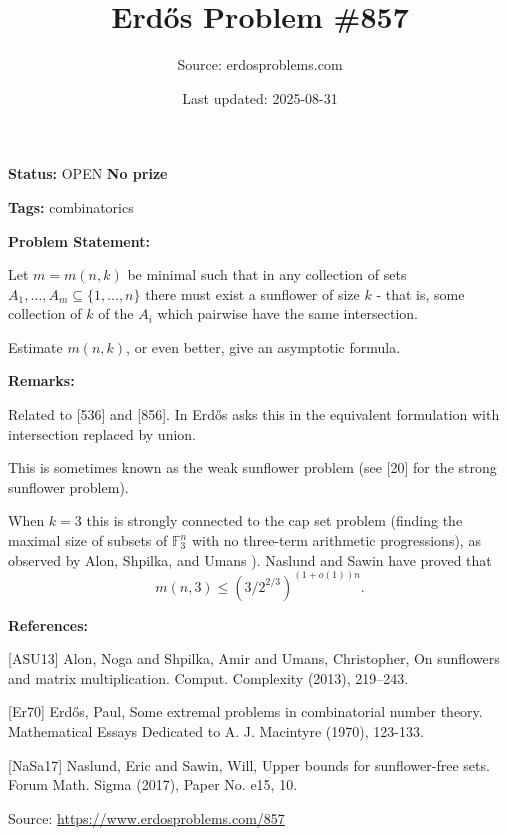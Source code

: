 \documentclass{article}
\title{Erd\H{o}s Problem \#857}
\date{Last updated: 2025-08-31}
\author{Source: erdosproblems.com}
\begin{document}
\maketitle

\noindent\textbf{Status:} OPEN \quad \textbf{No prize}

\noindent\textbf{Tags:} combinatorics

\medskip
\noindent\textbf{Problem Statement:}

Let $m=m(n,k)$ be minimal such that in any collection of sets $A_1,\ldots,A_m\subseteq \{1,\ldots,n\}$ there must exist a sunflower of size $k$ - that is, some collection of $k$ of the $A_i$ which pairwise have the same intersection.

Estimate $m(n,k)$, or even better, give an asymptotic formula.

\bigskip
\noindent\textbf{Remarks:}

Related to [536] and [856]. In \cite{Er70} Erd\H{o}s asks this in the equivalent formulation with intersection replaced by union.

This is sometimes known as the weak sunflower problem (see [20] for the strong sunflower problem).

When $k=3$ this is strongly connected to the cap set problem (finding the maximal size of subsets of $\mathbb{F}_3^n$ with no three-term arithmetic progressions), as observed by Alon, Shpilka, and Umans \cite{ASU13}). Naslund and Sawin \cite{NaSa17} have proved that\[m(n,3) \leq (3/2^{2/3})^{(1+o(1))n}.\]

\bigskip
\noindent\textbf{References:}

[ASU13] Alon, Noga and Shpilka, Amir and Umans, Christopher, On sunflowers and matrix multiplication. Comput. Complexity (2013), 219--243.
 
 [Er70] Erd\H{o}s, Paul, Some extremal problems in combinatorial number theory. Mathematical Essays Dedicated to A. J. Macintyre (1970), 123-133.
 
 [NaSa17] Naslund, Eric and Sawin, Will, Upper bounds for sunflower-free sets. Forum Math. Sigma (2017), Paper No. e15, 10.

\bigskip
\noindent\small{Source: \url{https://www.erdosproblems.com/857}}
\end{document}

